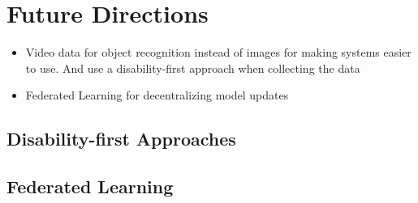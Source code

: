 \section{Future Directions}\label{chap5:sec:future_directions}

\begin{itemize}
	\item Video data for object recognition instead of images for making systems easier to use. And use a disability-first approach when collecting the data
	\item Federated Learning for decentralizing model updates 
\end{itemize}


\subsection{Disability-first Approaches}


\subsection{Federated Learning}